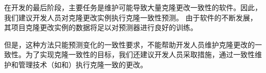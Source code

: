 在开发的最后阶段，主要任务是维护可能导致大量克隆更改一致性的软件。因此，我们建议开发人员对克隆更改实例执行克隆一致性预测。
由于软件的不断发展，其项目克隆更改实例的数据将足以对预测器进行良好的训练。

但是，这种方法只能预测变化的一致性要求，不能帮助开发人员维护克隆更改的一致性。为了实现克隆一致性的目标，我们还建议开发人员采取措施，通过一致性维护和管理技术（如\cite{cheng2016rule}和\cite{nguyen2012clone}）执行克隆一致的更改。







